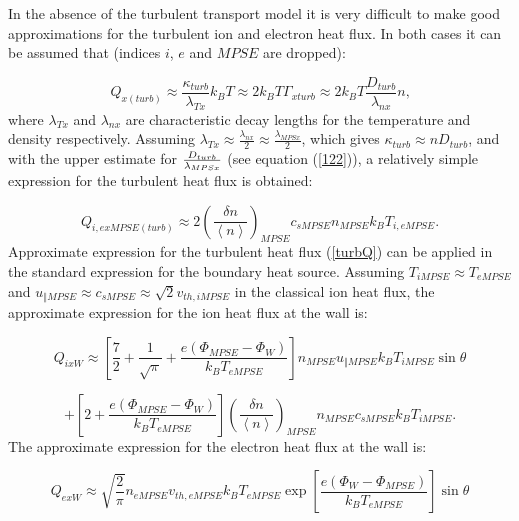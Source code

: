 \documentclass[11pt]{article}
\begin{document}
\bigskip

In the absence of the turbulent transport model it is very difficult to make
good approximations for the turbulent ion and electron heat flux. In both
cases it can be assumed that (indices $i$, $e$ and $MPSE$ are dropped):

\begin{equation}
Q_{x(turb)}\approx\frac{\kappa_{turb}}{\lambda_{Tx}}k_{B}T\approx2k_{B}T%
\Gamma_{xturb}\approx2k_{B}T\frac{D_{turb}}{\lambda_{nx}}n\text{,} 
\label{142}
\end{equation}
where $\lambda_{Tx}$ and $\lambda_{nx}$ are characteristic decay lengths for
the temperature and density respectively. Assuming $\lambda_{Tx}\approx 
\frac{\lambda_{nx}}{2}\approx\frac{\lambda_{MPSx}}{2}$, which gives $%
\kappa_{turb}\approx nD_{turb}$, and with the upper estimate for $\frac{%
D_{turb}}{\lambda_{MPSx}}$ (see equation (\ref{122})), a relatively simple
expression for the turbulent heat flux is obtained:

\begin{equation}
Q_{i,exMPSE(turb)}\approx2\left( \frac{\delta n}{\left\langle n\right\rangle 
}\right) _{MPSE}c_{sMPSE}n_{MPSE}k_{B}T_{i,eMPSE}\text{.}   \label{turbQ}
\end{equation}
Approximate expression for the turbulent heat flux (\ref{turbQ}) can be
applied in the standard expression for the boundary heat source. Assuming $%
T_{iMPSE}\approx T_{eMPSE}$ and $u_{\Vert MPSE}\approx c_{sMPSE}\approx 
\sqrt{2}v_{th,iMPSE}$ in the classical ion heat flux, the approximate
expression for the ion heat flux at the wall is:

\begin{equation*}
Q_{ixW}\approx\left[ \frac{7}{2}+\frac{1}{\sqrt{\pi}}+\frac{e\left(
\Phi_{MPSE}-\Phi_{W}\right) }{k_{B}T_{eMPSE}}\right] n_{MPSE}u_{\Vert
MPSE}k_{B}T_{iMPSE}\sin\theta 
\end{equation*}

\begin{equation}
+\left[ 2+\frac{e\left( \Phi_{MPSE}-\Phi_{W}\right) }{k_{B}T_{eMPSE}}\right]
\left( \frac{\delta n}{\left\langle n\right\rangle }\right)
_{MPSE}n_{MPSE}c_{sMPSE}k_{B}T_{iMPSE}\text{.}   \label{approxQi}
\end{equation}
The approximate expression for the electron heat flux at the wall is:

\begin{equation*}
Q_{exW}\approx\sqrt{\frac{2}{\pi}}n_{eMPSE}v_{th,eMPSE}k_{B}T_{eMPSE}\exp%
\left[ \frac{e\left( \Phi_{W}-\Phi_{MPSE}\right) }{k_{B}T_{eMPSE}}\right]
\sin\theta 
\end{equation*}
\end{document}
